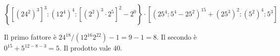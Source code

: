 
\begin{esercizio}
\[
    \left\{[(24^2)^3]^3:(12^4)^4:[(2^2)^3\cdot 2^5]^2-2^0\right\}
    \cdot
    \left[(25^4:5^4-25^2)^{15}+(25^3)^2:(5^2)^4:5^3\right]
    \]
\end{esercizio}

\begin{soluzione}
Il primo fattore è $24^{18}/(12^{16}2^{22})-1=9-1=8$.
Il secondo è $0^{15}+5^{12-8-3}=5$. Il prodotto vale $40$.
\end{soluzione}
